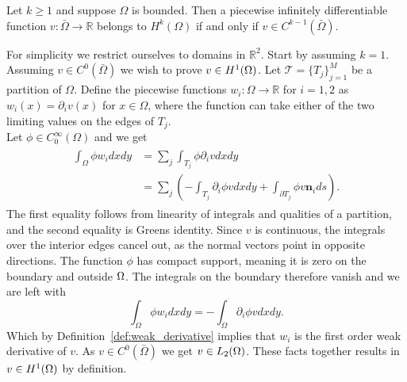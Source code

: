 
\begin{thmx}{\quad\label{thm:h-and-c_connection}}
    Let $k\geq1$ and suppose $\Omega$ is bounded. Then a piecewise infinitely differentiable function $v:\bar{\Omega}\rightarrow \mathbb{R}$
    belongs to $H^k(\Omega)$ if and only if $v\in C^{k-1}(\bar{\Omega})$.
\end{thmx}

\begin{bev}
    For simplicity we restrict ourselves to domains in $\mathbb{R}^2$.
    Start by assuming $k=1$.
    Assuming $v\in C^0(\bar\Omega)$ we wish to prove $v\in H^1(\Omega)$. Let $\mathcal{T}={\{T_j\}}^M_{j=1}$ be a partition of $\Omega$.
    Define the piecewise functions $w_i:\Omega\rightarrow \mathbb{R}$ for $i=1,2$ as $w_i(x)=\partial_i v(x)$ for $x\in\Omega$,
     where the function can take either of the two limiting values on the edges of $T_j$. %
    \\
    Let $\phi\in C^{\infty}_0 (\Omega)$
   and we get
    \begin{align}
    \begin{split}
    \int_\Omega \phi w_i dxdy &= \sum_j\int_{T_j} \phi \partial_i v dx dy \\
        &= \sum_j \left( -\int_{T_j} \partial_i \phi v dxdy + \int_{\partial T_j} \phi v \mathbf{n}_i ds\right).
    \end{split}
    \end{align}
    The first equality follows from linearity of integrals and qualities of a partition, and the second equality is Greens identity.
    Since $v$ is continuous, 
    the integrals over the interior edges cancel out,
    as the normal vectors point in opposite directions.
     The function $\phi$ has compact support, 
     meaning it is zero on the boundary and outside $\Omega$. 
     The integrals on the boundary therefore vanish and we are left with
    \begin{equation}
        \int_\Omega \phi w_i dxdy = -\int_\Omega \partial_i \phi v dxdy.
    \end{equation}
    Which by Definition~\ref{def:weak_derivative} implies that $w_i$ is the first order weak derivative of $v$.
    As $v\in C^0(\bar\Omega)$ we get $v \in L_2(\Omega)$. These facts together results in $v\in H^1(\Omega)$ by definition.


\end{bev}
